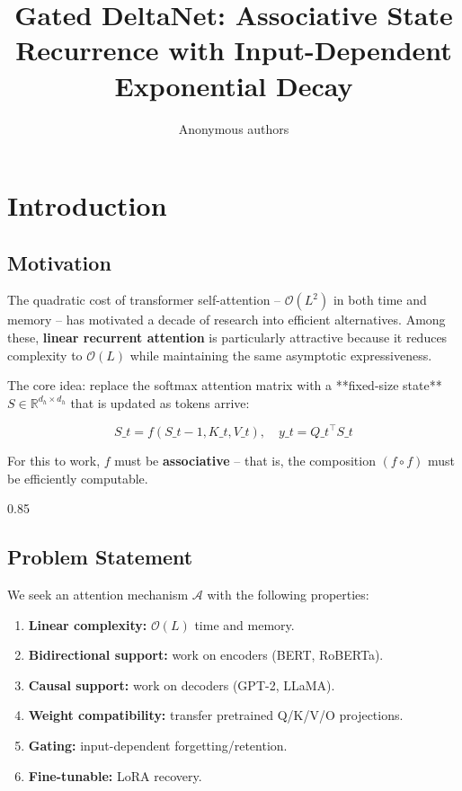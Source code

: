 \title{\textbf{Gated DeltaNet: Associative State Recurrence with Input-Dependent Exponential Decay}}

\author{Anonymous authors}



\section{Introduction}

\subsection{Motivation}

The quadratic cost of transformer self-attention -- $\mathcal{O}(L^2)$ in 
both time and memory -- has motivated a decade of research into efficient 
alternatives. Among these, \textbf{linear recurrent attention} is particularly 
attractive because it reduces complexity to $\mathcal{O}(L)$ while 
maintaining the same asymptotic expressiveness.

The core idea: replace the softmax attention matrix with a **fixed-size 
state** $S \in \mathbb{R}^{d_h \times d_h}$ that is updated as tokens arrive:

\[
S\_t = f(S\_{t-1}, K\_t, V\_t), \quad y\_t = Q\_t^\top S\_t
\tag{1.1}
\]

For this to work, $f$ must be \textbf{associative} -- that is, the composition 
$(f \circ f)$ must be efficiently computable.

0.85


\subsection{Problem Statement}

We seek an attention mechanism $\mathcal{A}$ with the following properties:

\begin{enumerate}
\item \textbf{Linear complexity:} $\mathcal{O}(L)$ time and memory.
\item \textbf{Bidirectional support:} work on encoders (BERT, RoBERTa).
\item \textbf{Causal support:} work on decoders (GPT-2, LLaMA).
\item \textbf{Weight compatibility:} transfer pretrained Q/K/V/O projections.
\item \textbf{Gating:} input-dependent forgetting/retention.
\item \textbf{Fine-tunable:} LoRA recovery.

\end{enumerate}
